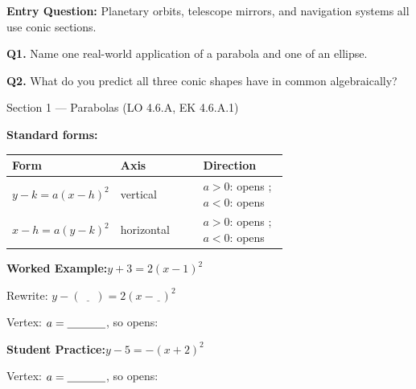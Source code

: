 \documentclass[10pt]{article}
\begin{document}
\vspace{0.08in}

\begin{hookbox}
\textbf{Entry Question:} Planetary orbits, telescope mirrors, and navigation
systems all use conic sections.

\vspace{4pt}
\textbf{Q1.} Name one real-world application of a parabola and one of an ellipse.

\textbf{Q2.} What do you predict all three conic shapes have in common
algebraically?
\end{hookbox}

\vspace{0.08in}

\begin{notesbox}{Section 1 --- Parabolas (LO 4.6.A, EK 4.6.A.1)}

\textbf{Standard forms:}

\vspace{4pt}
\renewcommand{\arraystretch}{1.8}
\begin{tabularx}{\linewidth}{@{} p{0.38\linewidth} p{0.30\linewidth} X @{}}
\textbf{Form} & \textbf{Axis} & \textbf{Direction} \\
\midrule
$y - k = a(x - h)^2$ & vertical & $a > 0$: opens \underline{\hspace{1.2cm}};
  $a < 0$: opens \underline{\hspace{1.2cm}} \\[4pt]
$x - h = a(y - k)^2$ & horizontal & $a > 0$: opens \underline{\hspace{1.2cm}};
  $a < 0$: opens \underline{\hspace{1.2cm}} \\
\end{tabularx}

\vspace{8pt}
\textbf{Worked Example:}\quad $y + 3 = 2(x - 1)^2$

Rewrite: $y - (\underline{\phantom{-3}}) = 2(x - \underline{\phantom{1}})^2$

Vertex: \blank{3cm} \quad $a = \blank{1.2cm}$, so opens: \blank{2cm}

\vspace{10pt}
\textbf{Student Practice:}\quad $y - 5 = -(x + 2)^2$

Vertex: \blank{3cm} \quad $a = \blank{1.2cm}$, so opens: \blank{2cm}

\end{notesbox}
\end{document}
